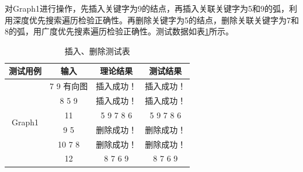 \documentclass[supercite]{Experimental_Report}
\theoremstyle{definition}
\begin{document}
\begin{enumerate}
	对Graph1进行操作，先插入关键字为9的结点，再插入关联关键字为5和9的弧，利用深度优先搜索遍历检验正确性。再删除关键字为5的结点，删除关联关键字为7和8的弧，用广度优先搜素遍历检验正确性。测试数据如表\ref{table5}所示。
	\begin{table}
		\begin{center}
		\setlength{\tabcolsep}{2.0mm}
		\caption{插入、删除测试表}
		\label{table5}
			\begin{tabular}{c|c|c|c}
			\hline
			测试用例    			     & 输入               & 理论结果         & 测试结果\\
			\hline
			\hline			
			\multirow{6}{*}{Graph1}   	& 7 9 有向图          & 插入成功！      & 插入成功！\\
										& 8 5 9		         & 插入成功！      & 插入成功！\\
										& 11		         & 5 9 7 8 6	  & 5 9 7 8 6\\
										& 9 5			     & 删除成功！ 	   & 删除成功！\\
										& 10 7 8		     & 删除成功！ 	   & 删除成功！\\
										& 12			     & 8 7 6 9  	  & 8 7 6 9\\
			\hline
			\end{tabular}
		\end{center}
	\end{table}
	

\end{enumerate}
\end{document}
